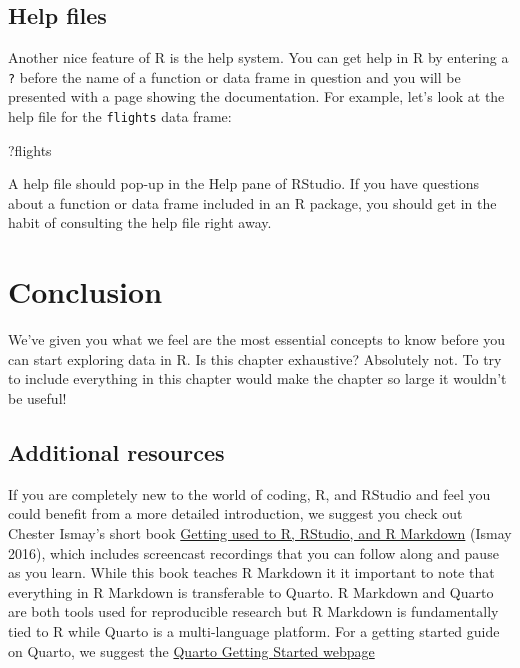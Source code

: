 \documentclass[
  letterpaper,
  DIV=11,
  numbers=noendperiod]{scrreprt}
\newenvironment{Shaded}{\begin{snugshade}}{\end{snugshade}}
\newcommand{\NormalTok}[1]{\textcolor[rgb]{0.00,0.23,0.31}{#1}}
\theoremstyle{definition}
\theoremstyle{remark}
\begin{document}
\hypertarget{help-files}{%
\subsection{Help files}\label{help-files}}

Another nice feature of R is the help system. You can get help in R by
entering a \texttt{?} before the name of a function or data frame in
question and you will be presented with a page showing the
documentation. For example, let's look at the help file for the
\texttt{flights} data frame:

\begin{Shaded}
\begin{Highlighting}[]
\NormalTok{?flights}
\end{Highlighting}
\end{Shaded}

A help file should pop-up in the Help pane of RStudio. If you have
questions about a function or data frame included in an R package, you
should get in the habit of consulting the help file right away.

\hypertarget{sec-gs-conclusion}{%
\section{Conclusion}\label{sec-gs-conclusion}}

We've given you what we feel are the most essential concepts to know
before you can start exploring data in R. Is this chapter exhaustive?
Absolutely not. To try to include everything in this chapter would make
the chapter so large it wouldn't be useful!

\hypertarget{additional-resources}{%
\subsection{Additional resources}\label{additional-resources}}

If you are completely new to the world of coding, R, and RStudio and
feel you could benefit from a more detailed introduction, we suggest you
check out Chester Ismay's short book
\href{https://rbasics.netlify.com/}{Getting used to R, RStudio, and R
Markdown} (Ismay 2016), which includes screencast recordings that you
can follow along and pause as you learn. While this book teaches R
Markdown it it important to note that everything in R Markdown is
transferable to Quarto. R Markdown and Quarto are both tools used for
reproducible research but R Markdown is fundamentally tied to R while
Quarto is a multi-language platform. For a getting started guide on
Quarto, we suggest the
\href{https://quarto.org/docs/get-started/hello/rstudio.html}{Quarto
Getting Started webpage}
\end{document}
